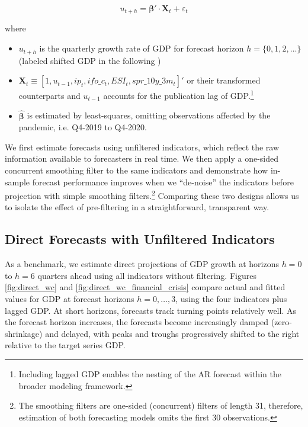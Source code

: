 \documentclass[11pt,a4paper]{article}
\begin{document}
\begin{equation}
    u_{t+h} = \boldsymbol{\beta'} \cdot \mathbf{X}_t + \varepsilon_t
    \label{eq:direct_forecast}
\end{equation}

where
\begin{itemize}
    \item $u_{t+h}$ is the quarterly growth rate of GDP for forecast horizon $h = \{0, 1, 2, ... \}$ (labeled shifted GDP in the following )
    \item $\mathbf{X}_t \equiv [1,u_{t-1}, ip_t, ifo\_c_t, ESI_t, spr\_10y\_3m_t]'$ or their transformed counterparts and $u_{t-1}$ accounts for the publication lag of GDP.\footnote{Including lagged GDP enables the nesting of the AR forecast within the broader modeling framework.}
    \item $\hat{\boldsymbol{\beta}}$ is estimated by least-squares, omitting observations affected by the pandemic, i.e. Q4-2019 to Q4-2020.
\end{itemize}

We first estimate forecasts using unfiltered indicators, which reflect the raw information available to forecasters in real time. We then apply a one-sided concurrent smoothing filter to the same indicators and demonstrate how in-sample forecast performance improves when we ``de-noise'' the indicators before projection with simple smoothing filters.\footnote{The smoothing filters are one-sided (concurrent) filters of length 31, therefore, estimation of both forecasting models omits the first 30 observations.} 
Comparing these two designs allows us to isolate the effect of pre-filtering in a straightforward, transparent way.


\subsection{Direct Forecasts with Unfiltered Indicators}\label{sec:cdf}

As a benchmark, we estimate direct projections of GDP growth at horizons $h=0$ to $h=6$ quarters ahead using all indicators without filtering.   
Figures \ref{fig:direct_wc} and \ref{fig:direct_wc_financial_crisis} compare actual and fitted values for GDP at forecast horizons $h = 0, \ldots, 3$, using the four indicators plus lagged GDP. 
At short horizons, forecasts track turning points relatively well. As the forecast horizon increases, the forecasts become increasingly damped (zero-shrinkage) and delayed, with peaks and troughs progressively shifted to the right relative to the target series GDP.
\end{document}
